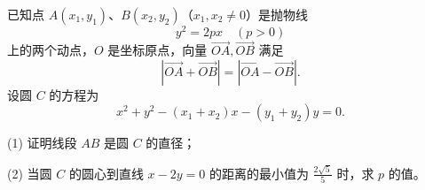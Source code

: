 \begin{question}
已知点 \(A(x_1,y_1)、B(x_2,y_2)\)（\(x_1,x_2\ne0\)）是抛物线
\nopagebreak[4]
\[
y^2=2px\quad(p>0)
\]
上的两个动点，\(O\) 是坐标原点，向量 \(\overrightarrow{OA},\overrightarrow{OB}\) 满足
\nopagebreak[4]
\[
\left|\overrightarrow{OA}+\overrightarrow{OB}\right|=
\left|\overrightarrow{OA}-\overrightarrow{OB}\right|.
\]
设圆 \(C\) 的方程为
\nopagebreak[4]
\[
x^2+y^2-(x_1+x_2)x-(y_1+y_2)y=0.
\]

(1) 证明线段 \(AB\) 是圆 \(C\) 的直径；

(2) 当圆 \(C\) 的圆心到直线 \(x-2y=0\) 的距离的最小值为 \(\frac{2\sqrt5}{5}\) 时，求 \(p\) 的值。

\end{question}